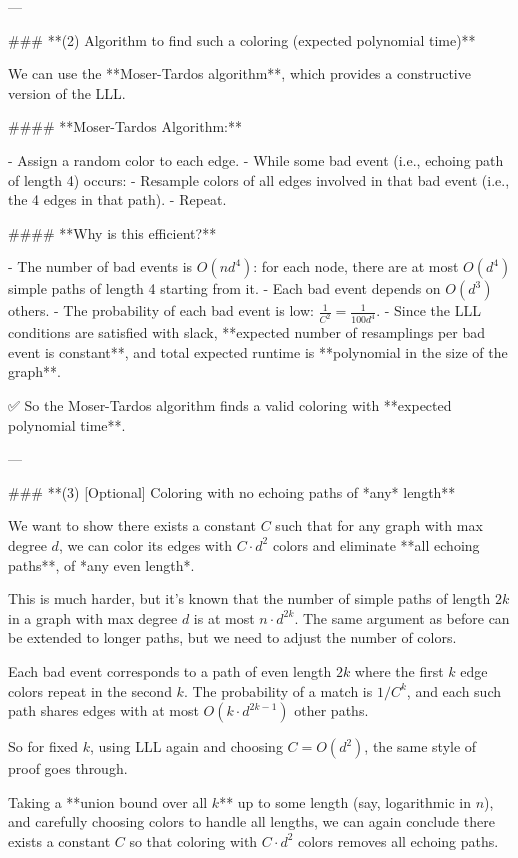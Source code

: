 \begin{enumerate}
\begin{shaded}
---

### **(2) Algorithm to find such a coloring (expected polynomial time)**

We can use the **Moser-Tardos algorithm**, which provides a constructive version of the LLL.

#### **Moser-Tardos Algorithm:**

- Assign a random color to each edge.
- While some bad event (i.e., echoing path of length 4) occurs:
  - Resample colors of all edges involved in that bad event (i.e., the 4 edges in that path).
  - Repeat.

#### **Why is this efficient?**

- The number of bad events is \(O(n d^4)\): for each node, there are at most \(O(d^4)\) simple paths of length 4 starting from it.
- Each bad event depends on \(O(d^3)\) others.
- The probability of each bad event is low: \(\frac{1}{C^2} = \frac{1}{100d^4}\).
- Since the LLL conditions are satisfied with slack, **expected number of resamplings per bad event is constant**, and total expected runtime is **polynomial in the size of the graph**.

✅ So the Moser-Tardos algorithm finds a valid coloring with **expected polynomial time**.

---

### **(3) [Optional] Coloring with no echoing paths of *any* length**

We want to show there exists a constant \(C\) such that for any graph with max degree \(d\), we can color its edges with \(C \cdot d^2\) colors and eliminate **all echoing paths**, of *any even length*.

This is much harder, but it's known that the number of simple paths of length \(2k\) in a graph with max degree \(d\) is at most \(n \cdot d^{2k}\). The same argument as before can be extended to longer paths, but we need to adjust the number of colors.

Each bad event corresponds to a path of even length \(2k\) where the first \(k\) edge colors repeat in the second \(k\). The probability of a match is \(1/C^k\), and each such path shares edges with at most \(O(k \cdot d^{2k-1})\) other paths.

So for fixed \(k\), using LLL again and choosing \(C = O(d^2)\), the same style of proof goes through.

Taking a **union bound over all \(k\)** up to some length (say, logarithmic in \(n\)), and carefully choosing colors to handle all lengths, we can again conclude there exists a constant \(C\) so that coloring with \(C \cdot d^2\) colors removes all echoing paths.


\end{shaded}
\end{enumerate}
